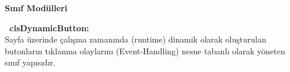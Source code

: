 \begin{minipage}[t]{0.48\textwidth}
    \vspace{0.4cm}

    {\Large \bfseries \textcolor{primary}{Sınıf Modülleri}} \\[0.2cm]

    \begin{tcolorbox}[colback=lightgray,colframe=bordergray,leftrule=3.5pt,boxrule=0.4pt,top=4.5pt,bottom=4.5pt]
        \textbf{\textcolor{primary}{\faCube\ clsDynamicButton:}}\\
        \small Sayfa üzerinde çalışma zamanında (runtime) dinamik olarak oluşturulan butonların tıklanma olaylarını (Event-Handling) nesne tabanlı olarak yöneten sınıf yapısıdır.
    \end{tcolorbox}
\end{minipage}